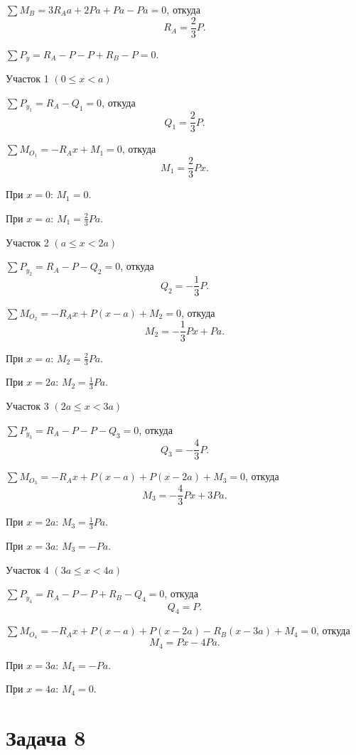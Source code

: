 $\sum M_B = 3 R_A a + 2 P a + Pa - Pa = 0$,
откуда
\[
    R_A = \frac{2}{3}P.
\]

$\sum P_y = R_A - P - P + R_B - P = 0$.

\vspace{1.5ex}

Участок 1 $\left(0 \le x < a\right)$

$\sum P_{y_1} = R_A - Q_1 = 0$,
откуда
\[
    Q_1 = \frac{2}{3}P.
\]

$\sum M_{O_1} = -R_A x + M_1 = 0$,
откуда
\[
    M_1 = \frac{2}{3} Px.
\]

При $x = 0$: $M_1 = 0$.

При $x = a$: $M_1 = \frac{2}{3} Pa$.

\vspace{1.5ex}

Участок 2 $\left(a \le x < 2a\right)$

$\sum P_{y_2} = R_A - P - Q_2 = 0$,
откуда
\[
    Q_2 = -\frac{1}{3}P.
\]

$\sum M_{O_2} = -R_A x + P (x - a) + M_2 = 0$,
откуда
\[
    M_2 = -\frac{1}{3}Px + Pa.
\]

При $x = a$: $M_2 = \frac{2}{3} Pa$.

При $x = 2 a$: $M_2 = \frac{1}{3} Pa$.

\vspace{1.5ex}

Участок 3 $\left(2a \le x < 3a\right)$

$\sum P_{y_3} = R_A - P - P - Q_3 = 0$,
откуда
\[
    Q_3 = -\frac{4}{3}P.
\]

$\sum M_{O_3} = -R_A x + P (x - a) + P (x - 2a) + M_3 = 0$,
откуда
\[
    M_3 = -\frac{4}{3}Px + 3Pa.
\]

При $x = 2 a$: $M_3 = \frac{1}{3} Pa$.

При $x = 3 a$: $M_3 = -Pa$.

\vspace{1.5ex}

Участок 4 $\left(3a \le x < 4a\right)$

$\sum P_{y_4} = R_A - P - P + R_B - Q_4 = 0$,
откуда
\[
    Q_4 = P.
\]

$\sum M_{O_4} = -R_A x + P (x - a) + P (x - 2a) - R_B (x - 3a) + M_4 = 0$,
откуда
\[
    M_4 = Px - 4Pa.
\]

При $x = 3 a$: $M_4 = -Pa$.

При $x = 4 a$: $M_4 = 0$.

\newpage


\section{Задача 8}

